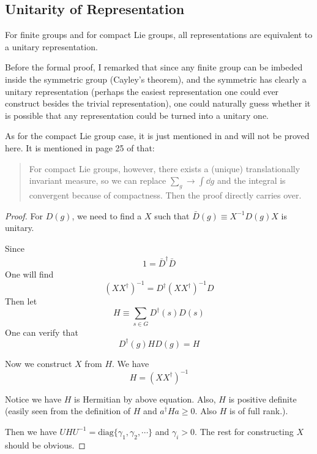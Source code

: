 

\subsection{Unitarity of Representation}
\label{sec:Unitarity-of-Representation}

\begin{thm}
    For finite groups and for compact Lie groups, all representations
    are equivalent to a unitary representation.
\end{thm}
\begin{remark}
    Before the formal proof, I remarked that since any finite group
    can be imbeded inside the symmetric group (Cayley's theorem), and
    the symmetric has clearly a unitary representation (perhaps the
    easiest representation one could ever construct besides the
    trivial representation), one could naturally guess whether it is
    possible that any representation could be turned into a unitary
    one.

    As for the compact Lie group case, it is just mentioned in
    \cite{Ludeling} and will not be proved here. It is mentioned in
    page 25 of \cite{Ludeling} that:
    \begin{quote}
        For compact Lie groups, however, there exists a (unique)
        translationally invariant measure, so we can replace
        $\sum_g\to \int \dd g$ and the integral is convergent because
        of compactness. Then the proof directly carries over.
    \end{quote}
\end{remark}
\begin{proof}
    For $D(g)$, we need to find a $X$ such that $\bar{D}(g)\equiv
    X^{-1}D(g)X$ is unitary.

    Since
    \begin{align*}
        1 = \bar{D}^\dagger \bar{D}
    \end{align*}
    One will find 
    $$ (XX^\dagger)^{-1} = D^\dagger (XX^\dagger)^{-1} D$$
    Then let
    \begin{equation}
        H\equiv \sum_{s\in G} D^\dagger(s) D(s)
    \end{equation}
    One can verify that
    \begin{equation}
        D^\dagger (g) H D(g) = H
    \end{equation}

    Now we construct $X$ from $H$. We have
    \begin{equation}
        H = (XX^\dagger)^{-1}
    \end{equation}

    Notice we have $H$ is Hermitian by above equation. Also, $H$ is
    positive definite (easily seen from the definition of $H$ and 
    $a^\dagger H a \geq 0$. Also $H$ is of full rank.).

    Then we have $UHU^{-1} = \mathrm{diag}\{\gamma_1,\gamma_2,\cdots\}$
    and $\gamma_i > 0$. The rest for constructing $X$ should be
    obvious.
\end{proof}
